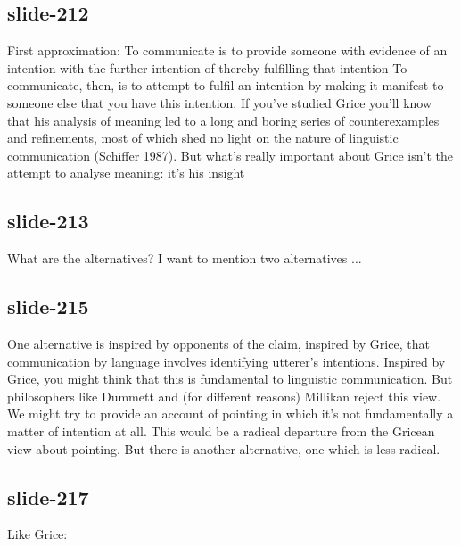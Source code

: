\documentclass[12pt,\papersize]{extarticle}
\begin{document}
 
\subsection{slide-212}
First approximation: To communicate is to provide someone with evidence of an intention with the further intention of thereby fulfilling that intention
To communicate, then, is to attempt to fulfil an intention by making it manifest to someone else that you have this intention. If you’ve studied Grice you’ll know that his analysis of meaning led to a long and boring series of counterexamples and refinements, most of which shed no light on the nature of linguistic communication (Schiffer 1987). But what’s really important about Grice isn’t the attempt to analyse meaning: it’s his insight
 
 
\subsection{slide-213}
What are the alternatives?
I want to mention two alternatives ...
 
 
\subsection{slide-215}
One alternative is inspired by opponents of the claim, inspired by Grice, that communication by language involves identifying utterer's intentions.
Inspired by Grice, you might think that this is fundamental to linguistic communication.
But philosophers like Dummett and (for different reasons) Millikan reject this view.
We might try to provide an account of pointing in which it's not fundamentally a matter of intention at all.
This would be a radical departure from the Gricean view about pointing. But there is another alternative, one which is less radical.
 
 
\subsection{slide-217}
Like Grice:
 
 
\end{document}
